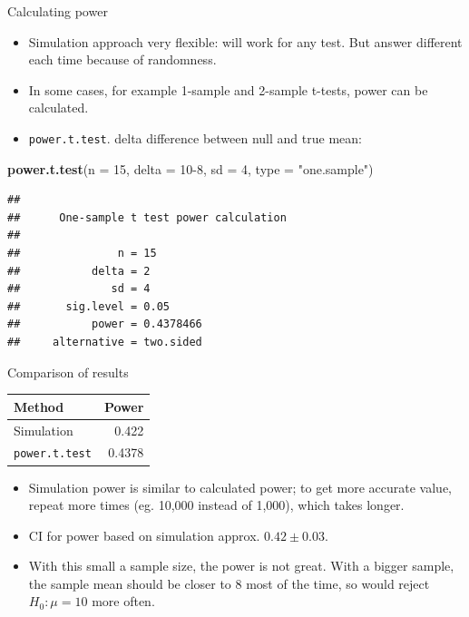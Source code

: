 \documentclass[ignorenonframetext,]{beamer}
\newenvironment{Shaded}{\begin{snugshade}}{\end{snugshade}}
\newcommand{\DataTypeTok}[1]{\textcolor[rgb]{0.13,0.29,0.53}{#1}}
\newcommand{\DecValTok}[1]{\textcolor[rgb]{0.00,0.00,0.81}{#1}}
\newcommand{\KeywordTok}[1]{\textcolor[rgb]{0.13,0.29,0.53}{\textbf{#1}}}
\newcommand{\NormalTok}[1]{#1}
\newcommand{\StringTok}[1]{\textcolor[rgb]{0.31,0.60,0.02}{#1}}
\providecommand{\tightlist}{%
  \setlength{\itemsep}{0pt}\setlength{\parskip}{0pt}}
\begin{document}
\begin{frame}[fragile]{Calculating power}
\protect\hypertarget{calculating-power}{}

\begin{itemize}
\tightlist
\item
  Simulation approach very flexible: will work for any test. But answer
  different each time because of randomness.
\item
  In some cases, for example 1-sample and 2-sample t-tests, power can be
  calculated.
\item
  \texttt{power.t.test}. delta difference between null and true mean:
\end{itemize}

\begin{Shaded}
\begin{Highlighting}[]
\KeywordTok{power.t.test}\NormalTok{(}\DataTypeTok{n =} \DecValTok{15}\NormalTok{, }\DataTypeTok{delta =} \DecValTok{10-8}\NormalTok{, }\DataTypeTok{sd =} \DecValTok{4}\NormalTok{, }\DataTypeTok{type =} \StringTok{"one.sample"}\NormalTok{)}
\end{Highlighting}
\end{Shaded}

\begin{verbatim}
## 
##      One-sample t test power calculation 
## 
##               n = 15
##           delta = 2
##              sd = 4
##       sig.level = 0.05
##           power = 0.4378466
##     alternative = two.sided
\end{verbatim}

\end{frame}

\begin{frame}{Comparison of results}
\protect\hypertarget{comparison-of-results}{}

\begin{center}
  \begin{tabular}{lr}
    Method & Power\\
    \hline
    Simulation & 0.422\\
    \texttt{power.t.test} & 0.4378\\
    \hline
  \end{tabular}
    
  \end{center}

\begin{itemize}
\tightlist
\item
  Simulation power is similar to calculated power; to get more accurate
  value, repeat more times (eg. 10,000 instead of 1,000), which takes
  longer.
\item
  CI for power based on simulation approx. \(0.42 \pm 0.03\).
\item
  With this small a sample size, the power is not great. With a bigger
  sample, the sample mean should be closer to 8 most of the time, so
  would reject \(H_0 : \mu = 10\) more often.
\end{itemize}

\end{frame}
\end{document}
